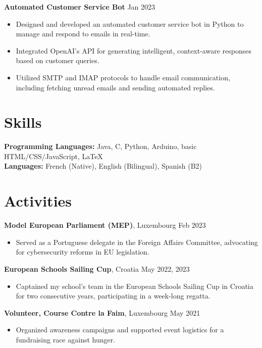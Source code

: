 \documentclass[10pt, letterpaper]{article}
\newenvironment{highlights}{
    \begin{itemize}[topsep=0.10cm, parsep=0.10cm, partopsep=0pt, itemsep=0pt, leftmargin=10pt]
}{
    \end{itemize}
}
\begin{document}
\textbf{Automated Customer Service Bot} \hfill Jan 2023 \\
\begin{highlights}
    \item Designed and developed an automated customer service bot in Python to manage and respond to emails in real-time.
    \item Integrated OpenAI's API for generating intelligent, context-aware responses based on customer queries.
    \item Utilized SMTP and IMAP protocols to handle email communication, including fetching unread emails and sending automated replies.
\end{highlights}

\section{Skills}
\textbf{Programming Languages:} Java, C, Python, Arduino, basic HTML/CSS/JavaScript, LaTeX \\
\textbf{Languages:} French (Native), English (Bilingual), Spanish (B2)

\section{Activities}

\textbf{Model European Parliament (MEP)}, Luxembourg \hfill Feb 2023 \\
\begin{highlights}
    \item Served as a Portuguese delegate in the Foreign Affairs Committee, advocating for cybersecurity reforms in EU legislation.
\end{highlights}

\textbf{European Schools Sailing Cup}, Croatia \hfill May 2022, 2023 \\
\begin{highlights}
    \item Captained my school’s team in the European Schools Sailing Cup in Croatia for two consecutive years, participating in a week-long regatta.
\end{highlights}

\textbf{Volunteer, Course Contre la Faim}, Luxembourg \hfill May 2021 \\
\begin{highlights}
    \item Organized awareness campaigns and supported event logistics for a fundraising race against hunger.
\end{highlights}
\end{document}
